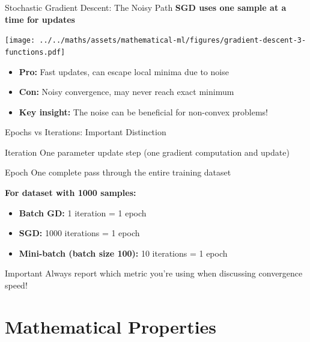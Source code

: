 \documentclass[usenames,dvipsnames]{beamer}
\begin{document}
  \begin{frame}{Stochastic Gradient Descent: The Noisy Path}
    \textbf{SGD uses one sample at a time for updates}
    
    \begin{center}
    \texttt{[image: ../../maths/assets/mathematical-ml/figures/gradient-descent-3-functions.pdf]}
    \end{center}
    
    \pause
    \begin{itemize}[<+->]
        \item \textbf{Pro:} Fast updates, can escape local minima due to noise
        \item \textbf{Con:} Noisy convergence, may never reach exact minimum
        \item \textbf{Key insight:} The noise can be beneficial for non-convex problems!
    \end{itemize}
  \end{frame}

  \begin{frame}{Epochs vs Iterations: Important Distinction}
    \begin{definitionbox}{Iteration}
    One parameter update step (one gradient computation and update)
    \end{definitionbox}
    
    \begin{definitionbox}{Epoch}
    One complete pass through the entire training dataset
    \end{definitionbox}
    
    \pause
    \textbf{For dataset with 1000 samples:}
    \begin{itemize}[<+->]
        \item \textbf{Batch GD:} 1 iteration = 1 epoch
        \item \textbf{SGD:} 1000 iterations = 1 epoch  
        \item \textbf{Mini-batch (batch size 100):} 10 iterations = 1 epoch
    \end{itemize}
    
    \pause
    \begin{alertbox}{Important}
    Always report which metric you're using when discussing convergence speed!
    \end{alertbox}
  \end{frame}

  \section{Mathematical Properties}
\end{document}
